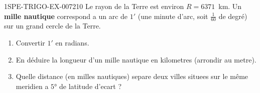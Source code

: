 \begin{exercice}{1SPE-TRIGO-EX-007}{2}{10}
Le rayon de la Terre est environ $R = 6371$~km. Un \textbf{mille nautique} correspond a un arc de $1'$ (une minute d'arc, soit $\frac{1}{60}$ de degré) sur un grand cercle de la Terre.
\begin{enumerate}
  \item Convertir $1'$ en radians.
  \item En déduire la longueur d'un mille nautique en kilometres (arrondir au metre).
  \item Quelle distance (en milles nautiques) separe deux villes situees sur le même meridien a $5°$ de latitude d'ecart ?
\end{enumerate}
\end{exercice}
